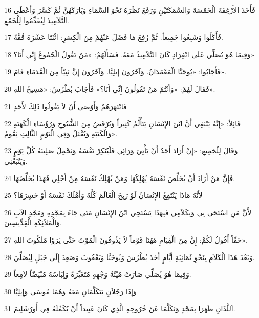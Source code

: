 \par 16 فَأَخَذَ الأَرْغِفَةَ الْخَمْسَةَ وَالسَّمَكَتَيْنِ وَرَفَعَ نَظَرَهُ نَحْوَ السَّمَاءِ وَبَارَكَهُنَّ ثُمَّ كَسَّرَ وَأَعْطَى التَّلاَمِيذَ لِيُقَدِّمُوا لِلْجَمْعِ.
\par 17 فَأَكَلُوا وَشَبِعُوا جَمِيعاً. ثُمَّ رُفِعَ مَا فَضَلَ عَنْهُمْ مِنَ الْكِسَرِ: اثْنَتَا عَشْرَةَ قُفَّةً.
\par 18 وَفِيمَا هُوَ يُصَلِّي عَلَى انْفِرَادٍ كَانَ التَّلاَمِيذُ مَعَهُ. فَسَأَلَهُمْ: «مَنْ تَقُولُ الْجُمُوعُ إِنِّي أَنَا؟»
\par 19 فَأَجَابُوا: «يُوحَنَّا الْمَعْمَدَانُ. وَآخَرُونَ إِيلِيَّا. وَآخَرُونَ إِنَّ نَبِيّاً مِنَ الْقُدَمَاءِ قَامَ».
\par 20 فَقَالَ لَهُمْ: «وَأَنْتُمْ مَنْ تَقُولُونَ إِنِّي أَنَا؟» فَأَجَابَ بُطْرُسُ: «مَسِيحُ اللهِ».
\par 21 فَانْتَهَرَهُمْ وَأَوْصَى أَنْ لاَ يَقُولُوا ذَلِكَ لأَحَدٍ
\par 22 قَائِلاً: «إِنَّهُ يَنْبَغِي أَنَّ ابْنَ الإِنْسَانِ يَتَأَلَّمُ كَثِيراً وَيُرْفَضُ مِنَ الشُّيُوخِ وَرُؤَسَاءِ الْكَهَنَةِ وَالْكَتَبَةِ وَيُقْتَلُ وَفِي الْيَوْمِ الثَّالِثِ يَقُومُ».
\par 23 وَقَالَ لِلْجَمِيعِ: «إِنْ أَرَادَ أَحَدٌ أَنْ يَأْتِيَ وَرَائِي فَلْيُنْكِرْ نَفْسَهُ وَيَحْمِلْ صَلِيبَهُ كُلَّ يَوْمٍ وَيَتْبَعْنِي.
\par 24 فَإِنَّ مَنْ أَرَادَ أَنْ يُخَلِّصَ نَفْسَهُ يُهْلِكُهَا وَمَنْ يُهْلِكُ نَفْسَهُ مِنْ أَجْلِي فَهَذَا يُخَلِّصُهَا.
\par 25 لأَنَّهُ مَاذَا يَنْتَفِعُ الإِنْسَانُ لَوْ رَبِحَ الْعَالَمَ كُلَّهُ وَأَهْلَكَ نَفْسَهُ أَوْ خَسِرَهَا؟
\par 26 لأَنَّ مَنِ اسْتَحَى بِي وَبِكَلاَمِي فَبِهَذَا يَسْتَحِي ابْنُ الإِنْسَانِ مَتَى جَاءَ بِمَجْدِهِ وَمَجْدِ الآبِ وَالْمَلاَئِكَةِ الْقِدِّيسِينَ.
\par 27 حَقّاً أَقُولُ لَكُمْ: إِنَّ مِنَ الْقِيَامِ هَهُنَا قَوْماً لاَ يَذُوقُونَ الْمَوْتَ حَتَّى يَرَوْا مَلَكُوتَ اللهِ».
\par 28 وَبَعْدَ هَذَا الْكَلاَمِ بِنَحْوِ ثَمَانِيَةِ أَيَّامٍ أَخَذَ بُطْرُسَ وَيُوحَنَّا وَيَعْقُوبَ وَصَعِدَ إِلَى جَبَلٍ لِيُصَلِّيَ.
\par 29 وَفِيمَا هُوَ يُصَلِّي صَارَتْ هَيْئَةُ وَجْهِهِ مُتَغَيِّرَةً وَلِبَاسُهُ مُبْيَضّاً لاَمِعاً.
\par 30 وَإِذَا رَجُلاَنِ يَتَكَلَّمَانِ مَعَهُ وَهُمَا مُوسَى وَإِيلِيَّا
\par 31 اَللَّذَانِ ظَهَرَا بِمَجْدٍ وَتَكَلَّمَا عَنْ خُرُوجِهِ الَّذِي كَانَ عَتِيداً أَنْ يُكَمِّلَهُ فِي أُورُشَلِيمَ.
